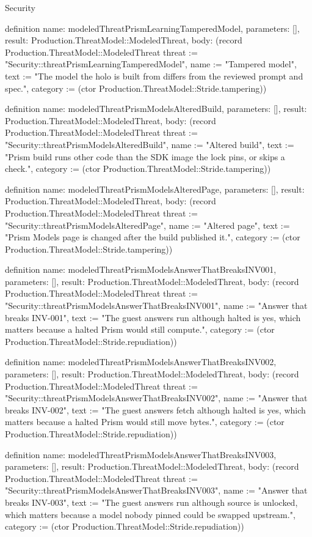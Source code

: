 \begin{lexlean}{Security}
\begin{semanticmodule}
definition{
  name: modeledThreatPrismLearningTamperedModel,
  parameters: [],
  result: Production.ThreatModel::ModeledThreat,
  body: (record Production.ThreatModel::ModeledThreat {threat := "Security::threatPrismLearningTamperedModel", name := "Tampered model", text := "The model the holo is built from differs from the reviewed prompt and spec.", category := (ctor Production.ThreatModel::Stride.tampering)})
}

definition{
  name: modeledThreatPrismModelsAlteredBuild,
  parameters: [],
  result: Production.ThreatModel::ModeledThreat,
  body: (record Production.ThreatModel::ModeledThreat {threat := "Security::threatPrismModelsAlteredBuild", name := "Altered build", text := "Prism build runs other code than the SDK image the lock pins, or skips a check.", category := (ctor Production.ThreatModel::Stride.tampering)})
}

definition{
  name: modeledThreatPrismModelsAlteredPage,
  parameters: [],
  result: Production.ThreatModel::ModeledThreat,
  body: (record Production.ThreatModel::ModeledThreat {threat := "Security::threatPrismModelsAlteredPage", name := "Altered page", text := "Prism Models page is changed after the build published it.", category := (ctor Production.ThreatModel::Stride.tampering)})
}

definition{
  name: modeledThreatPrismModelsAnswerThatBreaksINV001,
  parameters: [],
  result: Production.ThreatModel::ModeledThreat,
  body: (record Production.ThreatModel::ModeledThreat {threat := "Security::threatPrismModelsAnswerThatBreaksINV001", name := "Answer that breaks INV-001", text := "The guest answers run although halted is yes, which matters because a halted Prism would still compute.", category := (ctor Production.ThreatModel::Stride.repudiation)})
}

definition{
  name: modeledThreatPrismModelsAnswerThatBreaksINV002,
  parameters: [],
  result: Production.ThreatModel::ModeledThreat,
  body: (record Production.ThreatModel::ModeledThreat {threat := "Security::threatPrismModelsAnswerThatBreaksINV002", name := "Answer that breaks INV-002", text := "The guest answers fetch although halted is yes, which matters because a halted Prism would still move bytes.", category := (ctor Production.ThreatModel::Stride.repudiation)})
}

definition{
  name: modeledThreatPrismModelsAnswerThatBreaksINV003,
  parameters: [],
  result: Production.ThreatModel::ModeledThreat,
  body: (record Production.ThreatModel::ModeledThreat {threat := "Security::threatPrismModelsAnswerThatBreaksINV003", name := "Answer that breaks INV-003", text := "The guest answers run although source is unlocked, which matters because a model nobody pinned could be swapped upstream.", category := (ctor Production.ThreatModel::Stride.repudiation)})
}


\end{semanticmodule}
\end{lexlean}
